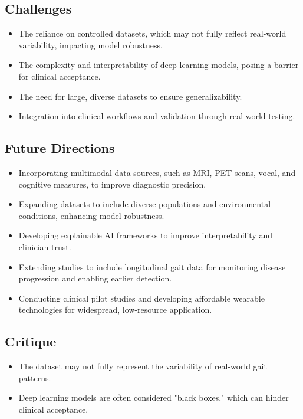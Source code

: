 \subsection*{Challenges}
\begin{itemize}
    \item The reliance on controlled datasets, which may not fully reflect real-world variability, impacting model robustness.
    \item The complexity and interpretability of deep learning models, posing a barrier for clinical acceptance.
    \item The need for large, diverse datasets to ensure generalizability.
    \item Integration into clinical workflows and validation through real-world testing.
\end{itemize}

\subsection*{Future Directions}
\begin{itemize}
    \item Incorporating multimodal data sources, such as MRI, PET scans, vocal, and cognitive measures, to improve diagnostic precision.
    \item Expanding datasets to include diverse populations and environmental conditions, enhancing model robustness.
    \item Developing explainable AI frameworks to improve interpretability and clinician trust.
    \item Extending studies to include longitudinal gait data for monitoring disease progression and enabling earlier detection.
    \item Conducting clinical pilot studies and developing affordable wearable technologies for widespread, low-resource application.
\end{itemize}

\subsection*{Critique}
\begin{itemize}
    \item The dataset may not fully represent the variability of real-world gait patterns.    
    \item Deep learning models are often considered "black boxes," which can hinder clinical acceptance.
\end{itemize}

